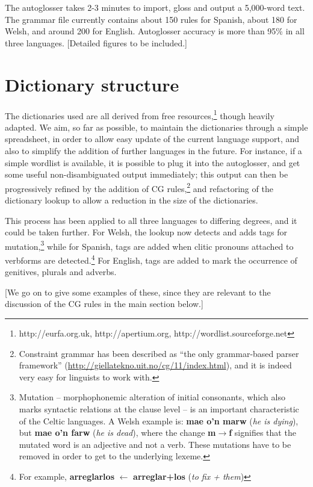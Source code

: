\documentclass[11pt]{article}
\begin{document}
The autoglosser takes 2-3 minutes to import, gloss and output a 5,000-word text.  The grammar file  currently contains about 150 rules for Spanish, about 180 for Welsh, and around 200 for English.  Autoglosser accuracy is more than 95\% in all three languages. [Detailed figures to be included.]

\section{Dictionary structure}
\label{sec:dictionary}

The dictionaries used are all derived from free resources,\footnote{http://eurfa.org.uk, http://apertium.org, http://wordlist.sourceforge.net} though heavily adapted.  We aim, so far as possible, to maintain the dictionaries through a simple spreadsheet, in order to allow easy update of the current language support, and also to simplify the addition of further languages in the future.  For instance, if a simple wordlist is available, it is possible to plug it into the autoglosser, and get some useful non-disambiguated output immediately; this output can then be progressively refined by the addition of CG rules,\footnote{Constraint grammar has been described as ``the only grammar-based parser framework'' (\url{http://giellatekno.uit.no/cg/11/index.html}), and it is indeed very easy for linguists to work with.} and refactoring of the dictionary lookup to allow a reduction in the size of the dictionaries. 

This process has been applied to all three languages to differing degrees, and it could be taken further.  For Welsh, the lookup now detects and adds tags for mutation,\footnote{Mutation -- morphophonemic alteration of initial consonants, which also marks syntactic relations at the clause level -- is an important characteristic of the Celtic languages. A Welsh example is: \textbf{mae o'n marw} (\textit{he is dying}), but \textbf{mae o'n farw} (\textit{he is dead}), where the change \textbf{m$\rightarrow$f} signifies that the mutated word is an adjective and not a verb. These mutations have to be removed in order to get to the underlying lexeme.} while for Spanish, tags are added when clitic pronouns attached to verbforms are detected.\footnote{For example, \textbf{arreglarlos} $\leftarrow$ \textbf{arreglar+los} (\textit{to fix + them})}  For English, tags are added to mark the occurrence of genitives, plurals and adverbs.

[We go on to give some examples of these, since they are relevant to the discussion of the CG rules in the main section below.]
\end{document}

